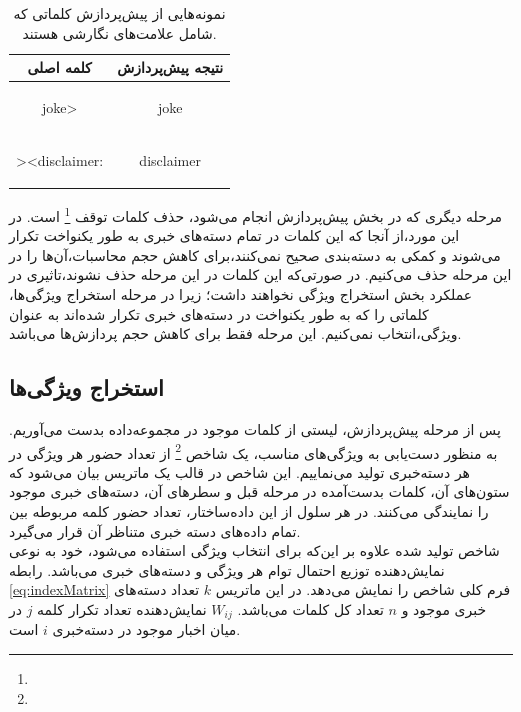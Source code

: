 \documentclass[11.5pt,a4paper]{article}
\begin{document}
\begin{table}[h]
\caption{نمونه‌هایی از پیش‌پردازش کلماتی که شامل علامت‌های نگارشی هستند.}
\label{table:preprocessPuncts}
\centering
\begin{tabular}{c | c}
کلمه اصلی & نتیجه پیش‌پردازش\\
\hline
\hline
	\begin{latin}
	joke>
	\end{latin}
	&
	\begin{latin}
	joke
	\end{latin}
\\
	\begin{latin}
	><disclaimer:
	\end{latin}
	&
	\begin{latin}
	disclaimer
	\end{latin}
\\
\end{tabular}
\end{table}

مرحله دیگری که در بخش پیش‌پردازش انجام می‌شود، حذف کلمات توقف
 \footnote{
 }
است. در این مورد،‌از آنجا که این کلمات در تمام دسته‌های خبری به طور یکنواخت تکرار می‌شوند و کمکی به دسته‌بندی صحیح نمی‌کنند،‌برای کاهش حجم محاسبات،‌آن‌ها را در این مرحله حذف می‌کنیم. در صورتی‌که این کلمات در این مرحله حذف نشوند،‌تاثیری در عملکرد بخش استخراج ویژگی نخواهند داشت؛ زیرا در مرحله استخراج ویژگی‌ها،‌ کلماتی را که به طور یکنواخت در دسته‌های خبری تکرار شده‌اند به عنوان ویژگی،‌انتخاب نمی‌کنیم. این مرحله فقط برای کاهش حجم پردازش‌ها می‌باشد.

\subsection{استخراج ویژگی‌ها}
پس از مرحله پیش‌پردازش، لیستی از کلمات موجود در مجموعه‌داده بدست می‌آوریم. به منظور دست‌یابی به ویژگی‌های مناسب، یک شاخص
\footnote{}
 از تعداد حضور هر ویژگی در هر دسته‌خبری تولید می‌نماییم. این شاخص در قالب یک ماتریس بیان می‌شود که ستون‌های آن، کلمات بدست‌آمده در مرحله قبل و سطرهای آن، دسته‌های خبری موجود را نمایندگی می‌کنند. در هر سلول از این داده‌ساختار، تعداد حضور کلمه مربوطه بین تمام ‌‌داده‌های دسته خبری متناظر آن قرار می‌گیرد. \\
شاخص تولید شده علاوه بر این‌که برای انتخاب ویژگی استفاده می‌شود، خود به نوعی نمایش‌دهنده توزیع احتمال توام هر ویژگی و دسته‌های خبری می‌باشد. رابطه \ref{eq:indexMatrix} فرم کلی شاخص را نمایش می‌دهد. در این ماتریس  $k$ تعداد دسته‌های خبری موجود و $n$ تعداد کل کلمات می‌باشد.
 $W_{ij}$ نمایش‌دهنده تعداد تکرار کلمه $j$ در میان اخبار موجود در دسته‌خبری $i$ است.
\end{document}
